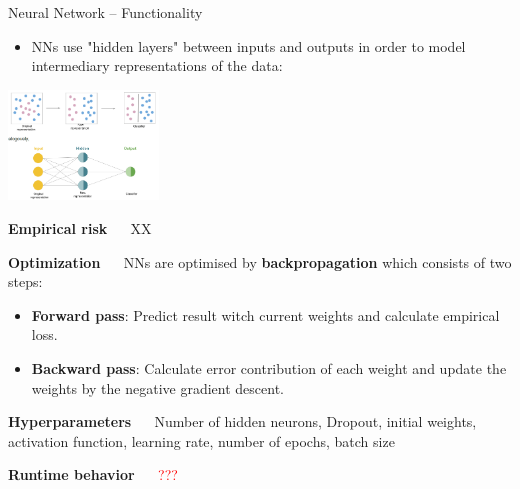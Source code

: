 \documentclass[11pt,compress,t,notes=noshow, xcolor=table]{beamer}
\newcommand{\highlight}[1]{\textcolor{highlightcol}{\textbf{#1}}}
\begin{document}
\begin{frame}{Neural Network -- Functionality}

\footnotesize

\begin{itemize}

\item NNs use "hidden layers" between inputs and outputs in order to model intermediary representations of the data: 

\end{itemize}



\medskip
\begin{center}
  \includegraphics[width=0.3\textwidth]{figure/nn_representation_learning.png}
\end{center}


\medskip



\highlight{Empirical risk} ~~ XX

% 
%   
%   
% 
% 
 \medskip

\highlight{Optimization} ~~ NNs are optimised by \textbf{backpropagation} which consists of two steps:
\begin{itemize}
  \item \textbf{Forward pass}: Predict result witch current weights and calculate empirical loss. 
  \item \textbf{Backward pass}: Calculate error contribution of each weight and update the weights by the negative gradient descent. 
\end{itemize}

\medskip

\highlight{Hyperparameters} ~~ Number of hidden neurons, Dropout, initial weights, activation function, learning rate, number of epochs, batch size \\

\medskip

\highlight{Runtime behavior} ~~ \textcolor{red}{???}

\end{frame}
\end{document}
